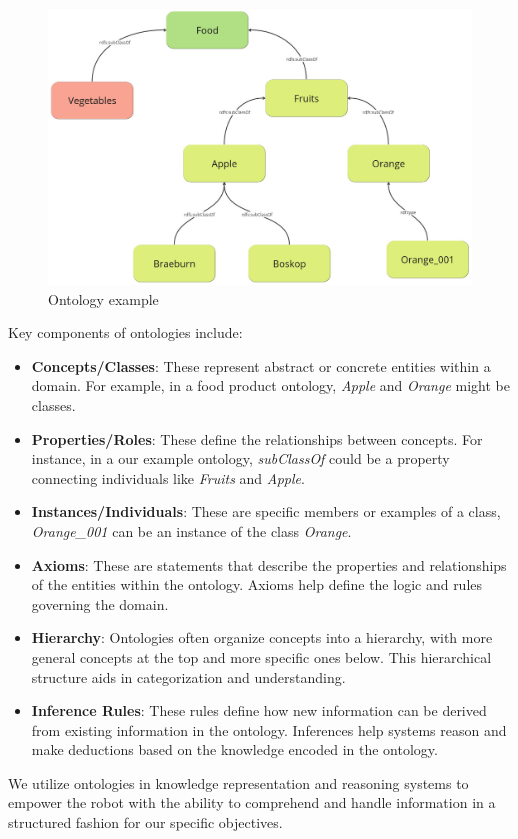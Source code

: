 \begin{figure}[H]
	\centering
	\includegraphics[scale=0.27]{Graphics/ontology.jpg}
	\caption{Ontology example}
\end{figure}
Key components of ontologies include:

\begin{itemize}
	\item \textbf{Concepts/Classes}: These represent abstract or concrete entities within a domain. For example, in a food product ontology, \textit{Apple} and \textit{Orange} might be classes.
	\item \textbf{Properties/Roles}: These define the relationships between concepts. For instance, in a our example ontology, \textit{subClassOf} could be a property connecting individuals like \textit{Fruits} and \textit{Apple}.
	\item \textbf{Instances/Individuals}: These are specific members or examples of a class, \textit{Orange\_001} can be an instance of the class \textit{Orange}.
	\item \textbf{Axioms}: These are statements that describe the properties and relationships of the entities within the ontology. Axioms help define the logic and rules governing the domain.
	\item \textbf{Hierarchy}: Ontologies often organize concepts into a hierarchy, with more general concepts at the top and more specific ones below. This hierarchical structure aids in categorization and understanding.
	\item \textbf{Inference Rules}: These rules define how new information can be derived from existing information in the ontology. Inferences help systems reason and make deductions based on the knowledge encoded in the ontology.
\end{itemize}
We utilize ontologies in knowledge representation and reasoning systems to empower the robot with the ability to comprehend and handle information in a structured fashion for our specific objectives.

